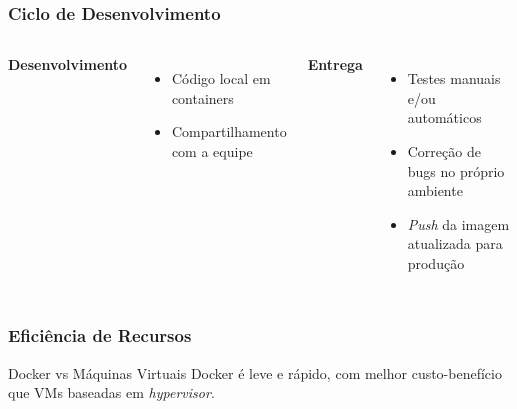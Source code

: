 \begin{frame}
  \frametitle{Ciclo de Desenvolvimento}
  \begin{columns}
    \textbf{Desenvolvimento}
    \begin{itemize}
      \item Código local em containers
      \item Compartilhamento com a equipe
    \end{itemize}

    \textbf{Entrega}
    \begin{itemize}
      \item Testes manuais e/ou automáticos
      \item Correção de bugs no próprio ambiente
      \item \textit{Push} da imagem atualizada para produção
    \end{itemize}
  \end{columns}
\end{frame}

\begin{frame}
  \frametitle{Eficiência de Recursos}
  \begin{alertblock}{Docker vs Máquinas Virtuais}
    Docker é leve e rápido, com melhor custo-benefício que VMs baseadas em \textit{hypervisor}.
  \end{alertblock}
\end{frame}